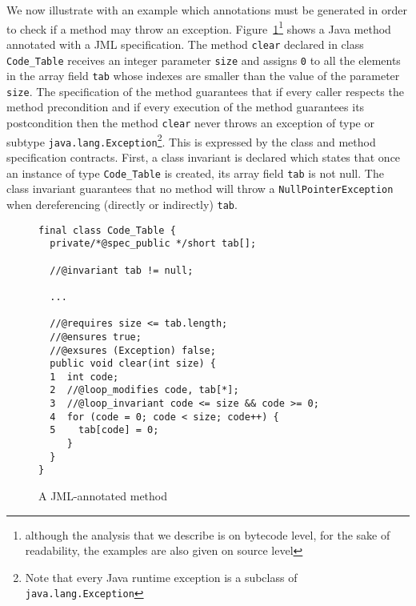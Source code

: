 We now illustrate with an example which annotations must be generated in order to check if a method may throw an exception. Figure~\ref{fig:jmlexample}\footnote{although the analysis that we describe is on bytecode level, for the sake of readability, the examples are also given on source level} shows a Java method annotated with a JML specification. The method \verb!clear! declared in class \verb!Code_Table! receives an integer parameter \verb!size! and assigns \verb!0! to all the elements in the array field \verb!tab! whose indexes are smaller than the value of the parameter \verb!size!. The specification of the method guarantees that if every caller respects the method precondition and if every execution of the method guarantees its postcondition then the method \verb!clear! never throws an exception of type or subtype \verb!java.lang.Exception!\footnote{Note that every Java runtime exception is a subclass of \texttt{java.lang.Exception}}. This is expressed by the class and method specification contracts.
First, a class invariant is declared which states that once an instance of type \verb!Code_Table! is created, its array field \verb!tab! is not null. The class invariant guarantees that no method will throw a \verb!NullPointerException! when dereferencing (directly or indirectly) \verb!tab!.

\begin{figure}
\begin{verbatim}
final class Code_Table {
  private/*@spec_public */short tab[];

  //@invariant tab != null;

  ...

  //@requires size <= tab.length;
  //@ensures true;
  //@exsures (Exception) false;
  public void clear(int size) {
  1  int code;
  2  //@loop_modifies code, tab[*];
  3  //@loop_invariant code <= size && code >= 0;
  4  for (code = 0; code < size; code++) {
  5    tab[code] = 0;
     }
  }
}
\end{verbatim}

\caption{\sc A JML-annotated method}
\label{fig:jmlexample}
\end{figure}


